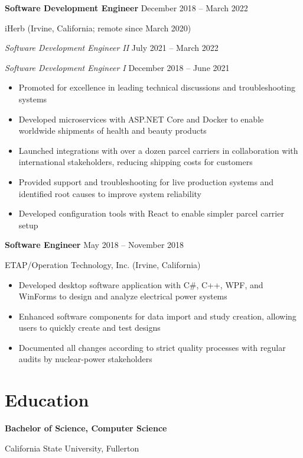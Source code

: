 \documentclass[12pt]{article}
\newcommand{\titleheader}[2]{\textbf{#1} \symbol{"B7} #2}
\newcommand{\secondaryheader}[2]{\hspace{0.25in} \textit{#1} \symbol{"B7} #2}
\newcommand{\locheader}[2]{#1 (#2)}
\begin{document}
	\titleheader{Software Development Engineer}{December 2018 -- March 2022}

	\locheader{iHerb}{Irvine, California; remote since March 2020}

	\secondaryheader{Software Development Engineer II}{July 2021 -- March 2022}

	\secondaryheader{Software Development Engineer I}{December 2018 -- June 2021}

	\begin{itemize}
		\item Promoted for excellence in leading technical discussions and troubleshooting systems
		\item Developed microservices with ASP.NET Core and Docker to enable worldwide shipments of health and beauty products
		\item Launched integrations with over a dozen parcel carriers in collaboration with international stakeholders, reducing shipping costs for customers
		\item Provided support and troubleshooting for live production systems and identified root causes to improve system reliability
		\item Developed configuration tools with React to enable simpler parcel carrier setup
	\end{itemize}

	\titleheader{Software Engineer}{May 2018 -- November 2018}

	\locheader{ETAP/Operation Technology, Inc.}{Irvine, California}

	\begin{itemize}
		\item Developed desktop software application with C\#, C++, WPF, and WinForms to design and analyze electrical power systems
		\item Enhanced software components for data import and study creation, allowing users to quickly create and test designs
		\item Documented all changes according to strict quality processes with regular audits by nuclear-power stakeholders
	\end{itemize}

	\section*{Education}

	\textbf{Bachelor of Science, Computer Science}

	California State University, Fullerton
\end{document}
